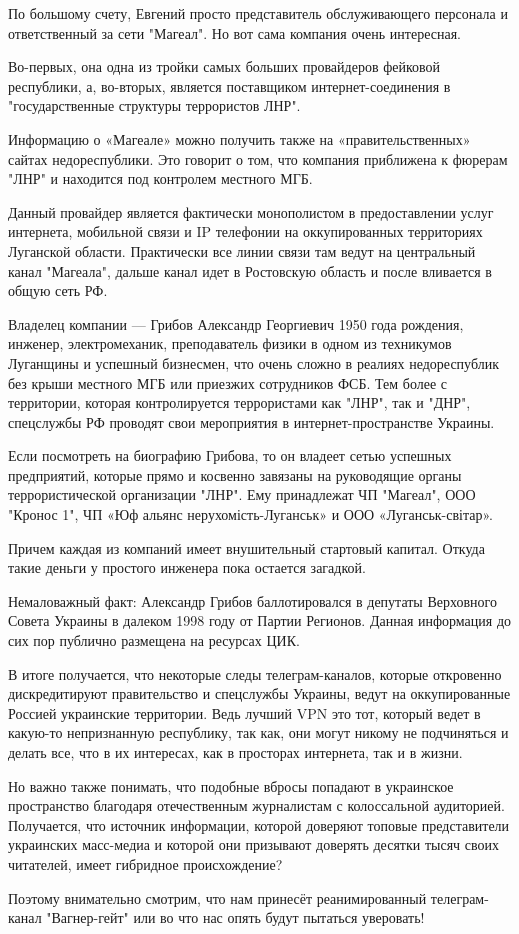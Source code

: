 По большому счету, Евгений просто представитель обслуживающего персонала и
ответственный за сети "Магеал". Но вот сама компания очень интересная.

Во-первых, она одна из тройки самых больших провайдеров фейковой республики, а,
во-вторых, является поставщиком интернет-соединения в "государственные
структуры террористов ЛНР".

Информацию о «Магеале» можно получить также на «правительственных» сайтах
недореспублики. Это говорит о том, что компания приближена к фюрерам "ЛНР" и
находится под контролем местного МГБ.

Данный провайдер является фактически монополистом в предоставлении услуг
интернета, мобильной связи и IP телефонии на оккупированных территориях
Луганской области. Практически все линии связи там ведут на центральный канал
"Магеала", дальше канал идет в Ростовскую область и после вливается в общую
сеть РФ.

Владелец компании --- Грибов Александр Георгиевич 1950 года рождения, инженер,
электромеханик, преподаватель физики в одном из техникумов Луганщины и успешный
бизнесмен, что очень сложно в реалиях недореспублик без крыши местного МГБ или
приезжих сотрудников ФСБ. Тем более с территории, которая контролируется
террористами как "ЛНР", так и "ДНР", спецслужбы РФ проводят свои мероприятия в
интернет-пространстве Украины.

Если посмотреть на биографию Грибова, то он владеет сетью успешных предприятий,
которые прямо и косвенно завязаны на руководящие органы террористической
организации "ЛНР". Ему принадлежат ЧП "Магеал", ООО "Кронос 1", ЧП «Юф альянс
нерухомість-Луганськ» и ООО «Луганськ-світар».

Причем каждая из компаний имеет внушительный стартовый капитал. Откуда такие
деньги у простого инженера пока остается загадкой.

Немаловажный факт: Александр Грибов баллотировался в депутаты Верховного Совета
Украины в далеком 1998 году от Партии Регионов. Данная информация до сих пор
публично размещена на ресурсах ЦИК.

В итоге получается, что некоторые следы телеграм-каналов, которые откровенно
дискредитируют правительство и спецслужбы Украины, ведут на оккупированные
Россией украинские территории. Ведь лучший VPN это тот, который ведет в
какую-то непризнанную республику, так как, они могут никому не подчиняться и
делать все, что в их интересах, как в просторах интернета, так и в жизни.

Но важно также понимать, что подобные вбросы попадают в украинское пространство
благодаря отечественным журналистам с колоссальной аудиторией. Получается, что
источник информации, которой доверяют топовые представители украинских
масс-медиа и которой они призывают доверять десятки тысяч своих читателей,
имеет гибридное происхождение?

Поэтому внимательно смотрим, что нам принесёт реанимированный телеграм-канал
"Вагнер-гейт" или во что нас опять будут пытаться уверовать!

